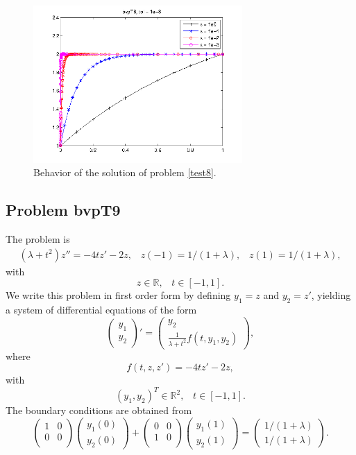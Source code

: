 \documentclass[<options>]{article}
\def \RR {{\mathbb{R}}}
\begin{document}
\begin{figure}[htb]
\centerline{\includegraphics[height=6cm]{Prob8}}
\caption{Behavior of the solution of problem \ref{test8}.}
\end{figure}
\newpage
\subsection{Problem bvpT9}\label{test9}
The problem is 
\begin{eqnarray*}
(\lambda + t^{2})z'' = -4tz' - 2z, \;\;\;z(-1) = 1 / (1 +\lambda), \;\;\; z(1) = 1 / (1 +\lambda),
\end{eqnarray*}
with
\[
z \in \RR, \;\;\; t\in [-1,1].
\]
We write this problem in first order form by defining $y_1=z$ and $y_2=z'$, yielding a system of differential equations of the form
\begin{equation*}
\left(\begin{array}{c}
y_1\\
y_2
\end{array}\right)'=
\left(\begin{array}{c}
y_2\\
\frac{1}{\lambda+ t^{2}}f(t,y_1,y_2)
\end{array}\right),
\end{equation*}
where
\begin{equation*}
 f(t,z,z') = -4tz' - 2z,
\end{equation*}
with
\[
(y_1,y_2)^T \in \RR^{2}, \;\;\;  t \in [-1,1].
\]
The  boundary conditions are obtained from
\begin{equation*}
\left(
  \begin{array}{cc}
    1 & 0 \\
    0 & 0 \\
  \end{array}
\right)
\left(\begin{array}{c}
y_{1}(0)\\
y_{2}(0)
\end{array}\right)
+
\left(
  \begin{array}{cc}
    0 & 0 \\
    1 & 0 \\
  \end{array}
\right)
\left(\begin{array}{c}
y_{1}(1)\\
y_{2}(1)
\end{array}\right)=\left(\begin{array}{c}
1 / (1 +\lambda) \\
1 / (1 +\lambda)
\end{array}\right).
\end{equation*}
\end{document}
